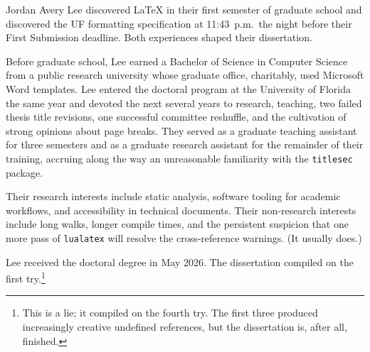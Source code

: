 
Jordan Avery Lee discovered LaTeX in their first semester of graduate
school and discovered the UF formatting specification at 11:43~p.m.\ the
night before their First Submission deadline. Both experiences shaped
their dissertation.

Before graduate school, Lee earned a Bachelor of Science in Computer
Science from a public research university whose graduate office,
charitably, used Microsoft Word templates. Lee entered the doctoral
program at the University of Florida the same year and devoted the
next several years to research, teaching, two failed thesis title
revisions, one successful committee reshuffle, and the cultivation of
strong opinions about page breaks. They served as a graduate teaching
assistant for three semesters and as a graduate research assistant for
the remainder of their training, accruing along the way an unreasonable
familiarity with the \texttt{titlesec} package.

Their research interests include static analysis, software tooling for
academic workflows, and accessibility in technical documents. Their
non-research interests include long walks, longer compile times, and
the persistent suspicion that one more pass of \texttt{lualatex} will
resolve the cross-reference warnings. (It usually does.)

Lee received the doctoral degree in May 2026. The dissertation
compiled on the first try.\footnote{This is a lie; it compiled on the
fourth try. The first three produced increasingly creative undefined
references, but the dissertation is, after all, finished.}
